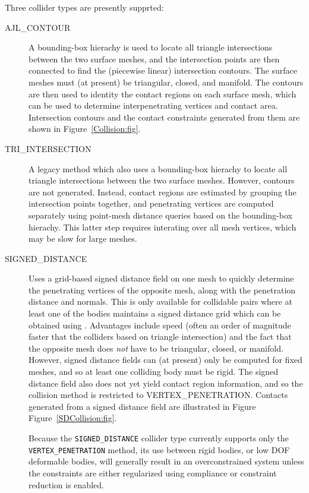 Three collider types are presently supprted:

\begin{description}

\item[AJL\_CONTOUR]\mbox{}

A bounding-box hierachy is used to locate all triangle intersections
between the two surface meshes, and the intersection points are then
connected to find the (piecewise linear) intersection contours.  The
surface meshes must (at present) be triangular, closed, and manifold.
The contours are then used to identity the contact regions
on each surface mesh, which can be used to determine interpenetrating
vertices and contact area. Intersection contours and the contact
constraints generated from them are shown in Figure~\ref{Collision:fig}.

\item[TRI\_INTERSECTION]\mbox{}

A legacy method which also uses a bounding-box hierachy to locate all
triangle intersections between the two surface meshes. However,
contours are not generated. Instead, contact regions are estimated by
grouping the intersection points together, and penetrating vertices
are computed separately using point-mesh distance queries based on the
bounding-box hierachy. This latter step requires interating over all
mesh vertices, which may be slow for large meshes.

\item[SIGNED\_DISTANCE]\mbox{}

Uses a grid-based signed distance field on one mesh to quickly
determine the penetrating vertices of the opposite mesh, along with
the penetration distance and normals.  This is only available for
collidable pairs where at least one of the bodies maintains a signed
distance grid which can be obtained using
.
Advantages include speed (often
an order of magnitude faster that the colliders based on triangle
intersection) and the fact that the opposite mesh does {\it not} have
to be triangular, closed, or manifold.  However, signed distance
fields can (at present) only be computed for fixed meshes, and so at
least one colliding body must be rigid.  The signed distance field
also does not yet yield contact region information, and so the collision
method is restricted to
%
{VERTEX\_PENETRATION}.
Contacts generated from a signed distance field are illustrated in
Figure Figure~\ref{SDCollision:fig}.

\begin{sideblock}
Because the {\tt SIGNED\_DISTANCE} collider type currently supports
only the {\tt VERTEX\_PENETRATION} method, its use between rigid
bodies, or low DOF deformable bodies, will generally result in an
overconstrained system unless the constraints are either regularized
using compliance or constraint reduction is enabled.
\end{sideblock}

\end{description}

